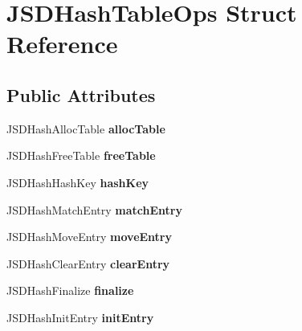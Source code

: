 \hypertarget{struct_j_s_d_hash_table_ops}{\section{J\-S\-D\-Hash\-Table\-Ops Struct Reference}
\label{struct_j_s_d_hash_table_ops}
}
\subsection*{Public Attributes}
\begin{DoxyCompactItemize}
\item 
\hypertarget{struct_j_s_d_hash_table_ops_ab6a1250ce816fc9a8466b728fe5d3cee}{J\-S\-D\-Hash\-Alloc\-Table {\bfseries alloc\-Table}}\label{struct_j_s_d_hash_table_ops_ab6a1250ce816fc9a8466b728fe5d3cee}

\item 
\hypertarget{struct_j_s_d_hash_table_ops_aab609679df10bd1bee40442d87cd7e39}{J\-S\-D\-Hash\-Free\-Table {\bfseries free\-Table}}\label{struct_j_s_d_hash_table_ops_aab609679df10bd1bee40442d87cd7e39}

\item 
\hypertarget{struct_j_s_d_hash_table_ops_ad00569bce7f06123c9af776d4776bbc6}{J\-S\-D\-Hash\-Hash\-Key {\bfseries hash\-Key}}\label{struct_j_s_d_hash_table_ops_ad00569bce7f06123c9af776d4776bbc6}

\item 
\hypertarget{struct_j_s_d_hash_table_ops_af7afac1effd865826fd17b061d960ae5}{J\-S\-D\-Hash\-Match\-Entry {\bfseries match\-Entry}}\label{struct_j_s_d_hash_table_ops_af7afac1effd865826fd17b061d960ae5}

\item 
\hypertarget{struct_j_s_d_hash_table_ops_a287cd6d464f1c6bcf0c674b0e373e498}{J\-S\-D\-Hash\-Move\-Entry {\bfseries move\-Entry}}\label{struct_j_s_d_hash_table_ops_a287cd6d464f1c6bcf0c674b0e373e498}

\item 
\hypertarget{struct_j_s_d_hash_table_ops_add81536f75a647405233f261f946094b}{J\-S\-D\-Hash\-Clear\-Entry {\bfseries clear\-Entry}}\label{struct_j_s_d_hash_table_ops_add81536f75a647405233f261f946094b}

\item 
\hypertarget{struct_j_s_d_hash_table_ops_aa0c0352076458e7ffa4022d18fac7148}{J\-S\-D\-Hash\-Finalize {\bfseries finalize}}\label{struct_j_s_d_hash_table_ops_aa0c0352076458e7ffa4022d18fac7148}

\item 
\hypertarget{struct_j_s_d_hash_table_ops_aa395be650509c171122d2a4a3c059d30}{J\-S\-D\-Hash\-Init\-Entry {\bfseries init\-Entry}}\label{struct_j_s_d_hash_table_ops_aa395be650509c171122d2a4a3c059d30}

\end{DoxyCompactItemize}


